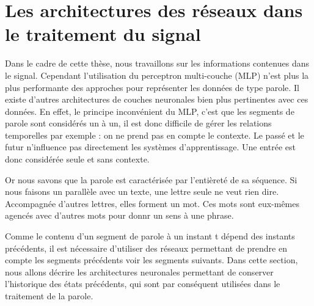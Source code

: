 %
%
%

\section{Les architectures des réseaux dans le traitement du signal}

Dans le cadre de cette thèse, nous travaillons sur les informations contenues dans le signal. %
Cependant l'utilisation du perceptron multi-couche (MLP) n'est plus la plus performante des approches pour représenter les données de type parole. Il existe d'autres architectures de couches neuronales bien plus pertinentes avec ces données. En effet, le principe inconvénient du MLP, c'est que les segments de parole sont considérés un à un, il est donc difficile de gérer les relations temporelles par exemple : on ne prend pas en compte le contexte. Le passé et le futur n'influence pas directement les systèmes d'apprentissage. Une entrée est donc considérée seule et sans contexte.

Or nous savons que la parole est caractérisée par l'entièreté de sa séquence. Si nous faisons un parallèle avec un texte, une lettre seule ne veut rien dire. Accompagnée d'autres lettres, elles forment un mot. Ces mots sont eux-mêmes agencés avec d'autres mots pour donnr un sens à une phrase.

Comme le contenu d'un segment de parole à un instant t dépend des instants précédents, il est nécessaire d'utiliser des réseaux permettant de prendre en compte les segments précédents voir les segments suivants. Dans cette section, nous allons décrire les architectures neuronales permettant de conserver l'historique des états précédents, qui sont par conséquent utilisées dans le traitement de la parole.

